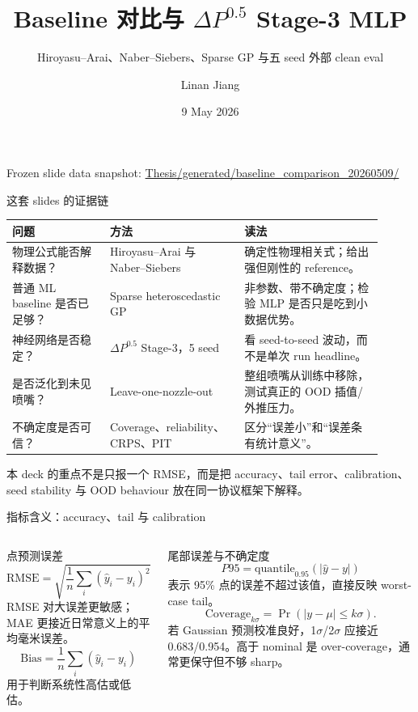 \documentclass[aspectratio=169,11pt]{beamer}
\title[Baseline Comparison]{Baseline 对比与 \texorpdfstring{\(\Delta P^{0.5}\)}{Delta P exponent 0.5} Stage-3 MLP}
\subtitle{Hiroyasu--Arai、Naber--Siebers、Sparse GP 与五 seed 外部 clean eval}
\author{Linan Jiang}
\institute{Aalto University}
\date{9 May 2026}
\begin{document}
\begin{frame}
  \titlepage
  \vspace{-0.8em}
  \centering
  \tiny Frozen slide data snapshot:
  \url{Thesis/generated/baseline_comparison_20260509/}
\end{frame}

\begin{frame}{这套 slides 的证据链}
\small
\begin{tabular}{L{0.24\linewidth}L{0.33\linewidth}L{0.34\linewidth}}
\toprule
问题 & 方法 & 读法 \\
\midrule
物理公式能否解释数据？ &
Hiroyasu--Arai 与 Naber--Siebers &
确定性物理相关式；给出强但刚性的 reference。 \\
普通 ML baseline 是否已足够？ &
Sparse heteroscedastic GP &
非参数、带不确定度；检验 MLP 是否只是吃到小数据优势。 \\
神经网络是否稳定？ &
\(\Delta P^{0.5}\) Stage-3，5 seed &
看 seed-to-seed 波动，而不是单次 run headline。 \\
是否泛化到未见喷嘴？ &
Leave-one-nozzle-out &
整组喷嘴从训练中移除，测试真正的 OOD 插值/外推压力。 \\
不确定度是否可信？ &
Coverage、reliability、CRPS、PIT &
区分“误差小”和“误差条有统计意义”。 \\
\bottomrule
\end{tabular}

\vspace{0.5em}
\footnotesize
本 deck 的重点不是只报一个 RMSE，而是把 accuracy、tail error、calibration、
seed stability 与 OOD behaviour 放在同一协议框架下解释。
\end{frame}

\begin{frame}{指标含义：accuracy、tail 与 calibration}
\small
\begin{columns}[T,onlytextwidth]
\begin{column}{0.48\linewidth}
\begin{block}{点预测误差}
\footnotesize
\[
\mathrm{RMSE}=\sqrt{\frac{1}{n}\sum_i(\hat y_i-y_i)^2},
\quad
\mathrm{MAE}=\frac{1}{n}\sum_i|\hat y_i-y_i|.
\]
RMSE 对大误差更敏感；MAE 更接近日常意义上的平均毫米误差。
\[
\mathrm{Bias}=\frac{1}{n}\sum_i(\hat y_i-y_i)
\]
用于判断系统性高估或低估。
\end{block}
\end{column}

\begin{column}{0.48\linewidth}
\begin{block}{尾部误差与不确定度}
\footnotesize
\[
P95=\mathrm{quantile}_{0.95}(|\hat y-y|)
\]
表示 95\% 点的误差不超过该值，直接反映 worst-case tail。
\[
\mathrm{Coverage}_{k\sigma}
=\Pr(|y-\mu|\leq k\sigma).
\]
若 Gaussian 预测校准良好，1\(\sigma\)/2\(\sigma\) 应接近
0.683/0.954。高于 nominal 是 over-coverage，通常更保守但不够 sharp。
\end{block}
\end{column}
\end{columns}
\end{frame}
\end{document}
